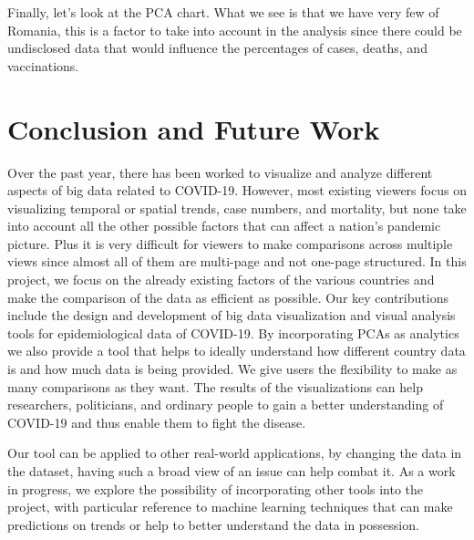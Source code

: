 \documentclass[10pt,conference]{IEEEtran}
\begin{document}
Finally, let's look at the PCA chart. What we see is that we have very few of Romania, this is a factor to take into account in the analysis since there could be undisclosed data that would influence the percentages of cases, deaths, and vaccinations.



\section{Conclusion and Future Work}
Over the past year, there has been worked to visualize and analyze different aspects of big data related to COVID-19. However, most existing viewers focus on visualizing temporal or spatial trends, case numbers, and mortality, but none take into account all the other possible factors that can affect a nation's pandemic picture. Plus it is very difficult for viewers to make comparisons across multiple views since almost all of them are multi-page and not one-page structured. In this project, we focus on the already existing factors of the various countries and make the comparison of the data as efficient as possible. Our key contributions include the design and development of big data visualization and visual analysis tools for epidemiological data of COVID-19. By incorporating PCAs as analytics we also provide a tool that helps to ideally understand how different country data is and how much data is being provided. We give users the flexibility to make as many comparisons as they want. The results of the visualizations can help researchers, politicians, and ordinary people to gain a better understanding of COVID-19 and thus enable them to fight the disease.

Our tool can be applied to other real-world applications, by changing the data in the dataset, having such a broad view of an issue can help combat it. As a work in progress, we explore the possibility of incorporating other tools into the project, with particular reference to machine learning techniques that can make predictions on trends or help to better understand the data in possession.
\end{document}
